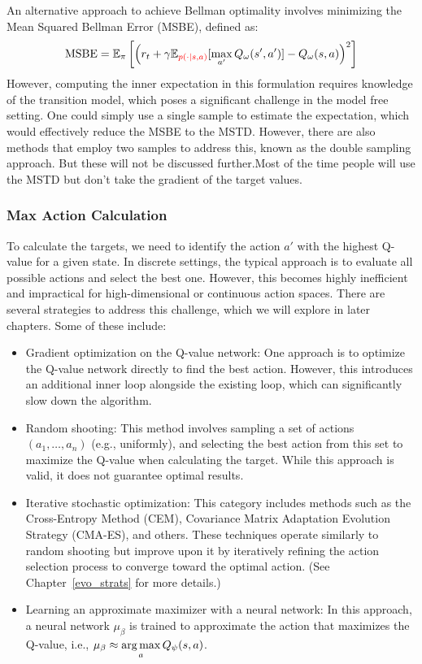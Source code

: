 An alternative approach to achieve Bellman optimality involves minimizing the Mean Squared 
Bellman Error (MSBE), defined as:
$$\text{MSBE} = \mathbb{E}_\pi\left[\left(r_t+ \gamma\mathbb{E}_{\color{red}p(\cdot|s, 
a)}[\max\limits_{a'}Q_\omega(s',a')]-Q_\omega(s,a)\right)^2\right] \label{MSBE}$$
However, computing the inner expectation in this formulation requires knowledge of the transition model,
which poses a significant challenge in the model free setting. One could simply use a single sample to 
estimate the expectation, which would effectively reduce the MSBE to the MSTD. However, there are also 
methods that employ two samples to address this, known as the double sampling approach. 
But these will not be discussed further.\newline Most of the time people will use the MSTD but don't take the gradient of 
the target values.

\subsubsection{Max Action Calculation}
To calculate the targets, we need to identify the action $a'$ with the highest Q-value for a given state. 
In discrete settings, the typical approach is to evaluate all possible actions and select the best one. 
However, this becomes highly inefficient and impractical for high-dimensional or continuous action spaces. 
There are several strategies to address this challenge, which we will explore in later chapters. Some of these include:

\begin{itemize}
    \item Gradient optimization on the Q-value network: One approach is to optimize the Q-value 
    network directly to find the best action. However, this introduces an additional inner loop 
    alongside the existing loop, which can significantly slow down the algorithm.
    
    \item Random shooting: This method involves sampling a set of actions $( a_1, \dots, a_n )$ 
    (e.g., uniformly), and selecting the best action from this set to maximize the Q-value when 
    calculating the target. While this approach is valid, it does not guarantee optimal results.
    
    \item Iterative stochastic optimization: This category includes methods such as the Cross-Entropy Method (CEM),
    Covariance Matrix Adaptation Evolution Strategy (CMA-ES), and others. These techniques operate similarly to random
    shooting but improve upon it by iteratively refining the action selection process to converge toward the optimal action. 
    (See Chapter~\ref{evo_strats} for more details.)

    \item Learning an approximate maximizer with a neural network: In this approach, a neural 
    network $ \mu_\beta $ is trained to approximate the action that maximizes the Q-value, i.e., 
    $ \mu_\beta \approx \operatorname*{arg\,max}\limits_a Q_\psi(s,a) $.
\end{itemize}

